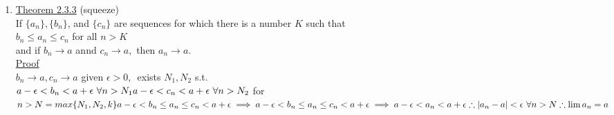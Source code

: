 \documentclass[12pt]{amsart}
\begin{document}
\begin{enumerate}
\item \underline{Theorem 2.3.3} (squeeze)\\
If $\{ a_n \}, \{ b_n \}$, and $\{ c_n \}$ are sequences for which there is a number $K$ such that\\
$b_n \leq a_n \leq c_n$ for all $ n>K $\\
and if $b_n \rightarrow a$ annd $c_n \rightarrow a,$ then $a_n \rightarrow a$.\\
\underline{Proof}\\
$b_n \rightarrow a, c_n \rightarrow a$ given $\epsilon >0$,\,\, exists $N_1, N_2$ s.t.\\
$a- \epsilon < b_n < a + \epsilon \,\, \forall n> N_1\\
a- \epsilon < c_n < a + \epsilon \,\, \forall n > N_2\\$
for $n>N = max \{ N_1, N_2, k \}\\
a- \epsilon < b_n \leq a_n \leq c_n < a + \epsilon\\
\implies a- \epsilon < b_n \leq a_n \leq c_n < a + \epsilon\\
\implies a- \epsilon < a_n < a+ \epsilon\\
\therefore | a_n - a | < \epsilon \,\, \forall n > N\\
\therefore \lim a_n = a\\$


\hdashrule[0.5ex][c]{\linewidth}{0.5pt}{1.5mm}



\end{enumerate}
\end{document}

